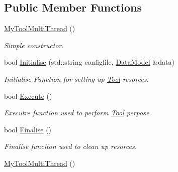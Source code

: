 \subsection*{Public Member Functions}
\begin{DoxyCompactItemize}
\item 
\hypertarget{classMyToolMultiThread_ac24f005c6da9c552871f6ff2672cf7f1}{\hyperlink{classMyToolMultiThread_ac24f005c6da9c552871f6ff2672cf7f1}{My\-Tool\-Multi\-Thread} ()}\label{classMyToolMultiThread_ac24f005c6da9c552871f6ff2672cf7f1}

\begin{DoxyCompactList}\small\item\em Simple constructor. \end{DoxyCompactList}\item 
bool \hyperlink{classMyToolMultiThread_a19dc55079a7b2da02ad9addd565b8e80}{Initialise} (std\-::string configfile, \hyperlink{classDataModel}{Data\-Model} \&data)
\begin{DoxyCompactList}\small\item\em Initialise Function for setting up \hyperlink{classTool}{Tool} resorces. \end{DoxyCompactList}\item 
\hypertarget{classMyToolMultiThread_a9cd7c894fc4797b2d81e12e25eb5beec}{bool \hyperlink{classMyToolMultiThread_a9cd7c894fc4797b2d81e12e25eb5beec}{Execute} ()}\label{classMyToolMultiThread_a9cd7c894fc4797b2d81e12e25eb5beec}

\begin{DoxyCompactList}\small\item\em Executre function used to perform \hyperlink{classTool}{Tool} perpose. \end{DoxyCompactList}\item 
\hypertarget{classMyToolMultiThread_a8f25561dc6a5daf8f4db85afecbb2c38}{bool \hyperlink{classMyToolMultiThread_a8f25561dc6a5daf8f4db85afecbb2c38}{Finalise} ()}\label{classMyToolMultiThread_a8f25561dc6a5daf8f4db85afecbb2c38}

\begin{DoxyCompactList}\small\item\em Finalise funciton used to clean up resorces. \end{DoxyCompactList}\item 
\hypertarget{classMyToolMultiThread_ac24f005c6da9c552871f6ff2672cf7f1}{\hyperlink{classMyToolMultiThread_ac24f005c6da9c552871f6ff2672cf7f1}{My\-Tool\-Multi\-Thread} ()}\label{classMyToolMultiThread_ac24f005c6da9c552871f6ff2672cf7f1}


\end{DoxyCompactItemize}
